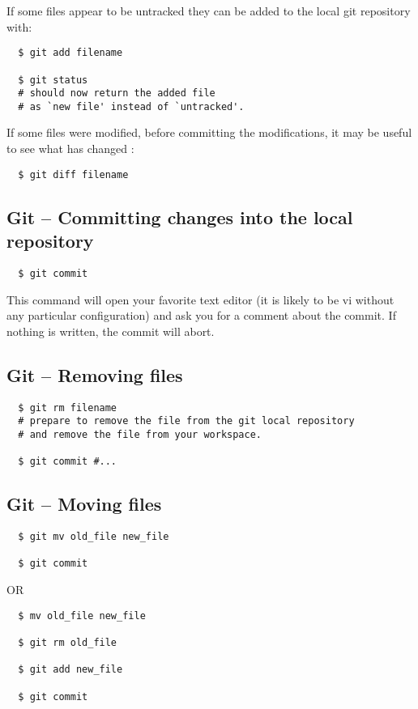 \documentclass[11pt,twoside]{article}
\begin{document}
If some files appear to be untracked they can be added to the local git repository with:

\begin{verbatim}
  $ git add filename

  $ git status
  # should now return the added file
  # as `new file' instead of `untracked'.
\end{verbatim}

If some files were modified, before committing the modifications, it may be useful to see what has changed :

\begin{verbatim}
  $ git diff filename
\end{verbatim}

\subsection*{Git -- Committing changes into the local repository}

\begin{verbatim}
  $ git commit
\end{verbatim}

This command will open your favorite text editor (it is likely to be vi without any particular configuration) and ask you for a comment about the commit. If nothing is written, the commit will abort.

\subsection*{Git -- Removing files}

\begin{verbatim}
  $ git rm filename
  # prepare to remove the file from the git local repository
  # and remove the file from your workspace.

  $ git commit #...
\end{verbatim}

\subsection*{Git -- Moving files}

\begin{verbatim}
  $ git mv old_file new_file

  $ git commit
\end{verbatim}

OR

\begin{verbatim}
  $ mv old_file new_file

  $ git rm old_file

  $ git add new_file

  $ git commit
\end{verbatim}
\end{document}
